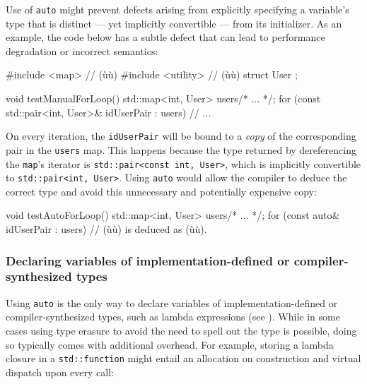 Use of \lstinline!auto! might prevent defects arising from explicitly
specifying a variable's type that is distinct --- yet implicitly
convertible --- from its initializer. As an example, the code below has
a subtle defect that can lead to performance degradation or incorrect
semantics:

\begin{emcppshiddenlisting}[emcppsbatch={e6,e7}]
#include <map>      // (ù{}ù)
#include <utility>  // (ù{}ù)
struct User {};
\end{emcppshiddenlisting}
\begin{emcppslisting}[emcppsbatch=e6]
void testManualForLoop()
{
    std::map<int, User> users{/* ... */};
    for (const std::pair<int, User>& idUserPair : users)
    {
        // ...
    }
}
\end{emcppslisting}
    
\noindent On every iteration, the \lstinline!idUserPair! will be bound to a
\emph{copy} of the corresponding pair in the \lstinline!users! map. This
happens because the type returned by dereferencing the \lstinline!map!'s
iterator is \lstinline!std::pair<const!~\lstinline!int,!~\lstinline!User>!, which
is implicitly convertible to \lstinline!std::pair<int,!~\lstinline!User>!.
Using \lstinline!auto! would allow the compiler to deduce the correct type
and avoid this unnecessary and potentially expensive copy:

\begin{emcppslisting}[emcppsbatch=e7]
void testAutoForLoop()
{
    std::map<int, User> users{/* ... */};
    for (const auto& idUserPair : users)
    {
        // (ù{}ù) is deduced as (ù{}ù).
    }
}
\end{emcppslisting}
    

\subsubsection[Declaring variables of implementation-defined or compiler-synthesized types]{Declaring variables of implementation-defined or compiler-synthesized types}\label{declaring-variables-of-implementation-defined-or-compiler-synthesized-types}

Using \lstinline!auto! is the only way to declare variables of
implementation-defined or compiler-synthesized types, such as
lambda expressions (see ). While in some cases 
using type erasure to avoid the need to spell out the type is possible, doing so typically
comes with additional overhead. For example, storing a lambda closure in
a \lstinline!std::function! might entail an allocation on construction and
virtual dispatch upon every call:

